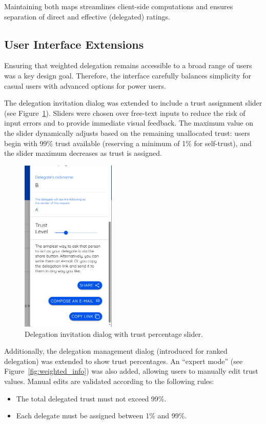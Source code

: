 Maintaining both maps streamlines client-side computations and ensures separation of direct and effective (delegated) ratings.

\subsection{User Interface Extensions}

Ensuring that weighted delegation remains accessible to a broad range of users was a key design goal. Therefore, the interface carefully balances simplicity for casual users with advanced options for power users.

The delegation invitation dialog was extended to include a trust assignment slider (see Figure~\ref{fig:trust-slider}). Sliders were chosen over free-text inputs to reduce the risk of input errors and to provide immediate visual feedback. The maximum value on the slider dynamically adjusts based on the remaining unallocated trust: users begin with 99\% trust available (reserving a minimum of 1\% for self-trust), and the slider maximum decreases as trust is assigned.

\begin{figure}[H]
    \centering
    \includegraphics[width=0.4\textwidth]{../common/weighted_sc/inv.png}
    \caption{Delegation invitation dialog with trust percentage slider.}
    \label{fig:trust-slider}
\end{figure}

Additionally, the delegation management dialog (introduced for ranked delegation) was extended to show trust percentages. An ``expert mode'' (see Figure~\ref{fig:weighted_info}) was also added, allowing users to manually edit trust values. Manual edits are validated according to the following rules:
\begin{itemize}
    \item The total delegated trust must not exceed 99\%.
    \item Each delegate must be assigned between 1\% and 99\%.
\end{itemize}

